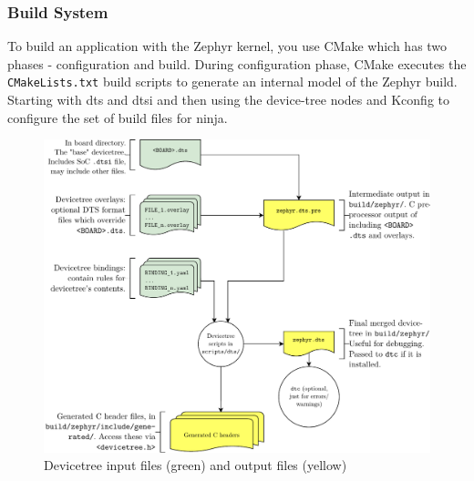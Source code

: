 \subsubsection{Build System}
To build an application with the Zephyr kernel, you use CMake which has two phases - configuration and build. During configuration phase, CMake executes the \texttt{CMakeLists.txt} build scripts to generate an internal model of the Zephyr build. Starting with \gls{dts} and \gls{dtsi} and then using the device-tree nodes and Kconfig to configure the set of build files for ninja.
\begin{figure}[htbp]
	\centering
	\includegraphics[width=.8\textwidth]{Figures/3_devicetree.pdf}
	\caption[Devicetree input files and output files]{Devicetree input files (green) and output files (yellow) \cite{zephyrprojectdocumentation}}
	\label{fig:3_devicetree}
\end{figure}
